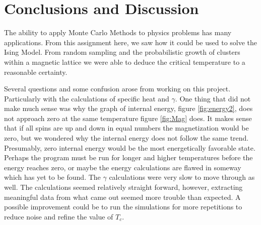 \documentclass[a4paper,twoside,12pt]{article}
\begin{document}
\section{Conclusions and Discussion}
The ability to apply Monte Carlo Methods to physics problems has many applications. From this assignment here, we saw how it could be used to solve the Ising Model. From random sampling and the probabilistic growth of clusters within a magnetic lattice we were able to deduce the critical temperature to a reasonable certainty. 

\vspace{3mm}

\noindent Several questions and some confusion arose from working on this project. Particularly with the calculations of specific heat and $\gamma$.  One thing that did not make much sense was why the graph of internal energy, figure \ref{fig:energy2}, does not approach zero at the same temperature figure \ref{fig:Mag} does. It makes sense that if all spins are up and down in equal numbers the magnetization would be zero, but we wondered why the internal energy does not follow the same trend. Presumably, zero internal energy would be the most energetically favorable state. Perhaps the program must be run for longer and higher temperatures before the energy reaches zero, or maybe the energy calculations are flawed in someway which has yet to be found. The $\gamma$ calculations were very slow to move through as well. The calculations seemed relatively straight forward, however, extracting meaningful data from what came out seemed more trouble than expected. A possible improvement could be to run the simulations for more repetitions to reduce noise and refine the value of $T_{c}$.
\end{document}
